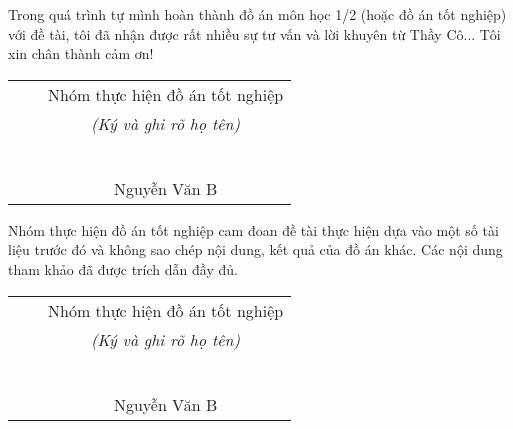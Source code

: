 \documentclass[a4paper, oneside]{book}
\begin{document}
\coverpage
\frontmatter


\begin{acknowledgments}
	Trong quá trình tự mình hoàn thành đồ án môn học 1/2 (hoặc đồ án tốt nghiệp) với đề tài, tôi đã nhận được rất nhiều sự tư vấn và lời khuyên từ Thầy Cô... Tôi xin chân thành cảm ơn!
\begin{table}[!h]
\centering
\begin{tabular}{p{3cm} p{3cm} p{3cm} p{3cm}}
&  & \multicolumn{2}{c}{Nhóm thực hiện đồ án tốt nghiệp} \\
&  & \multicolumn{2}{c}{\textit{(Ký và ghi rõ họ tên)}} \\
&  &             &            \\
&  &             &            \\
&  &             &            \\
&  &             &            \\
&  &             &            \\
&  &             &            \\
&  & \multicolumn{2}{c}{Nguyễn Văn B}     
\end{tabular}
\end{table}
\end{acknowledgments}

\begin{declaration}
	Nhóm thực hiện đồ án tốt nghiệp cam đoan đề tài thực hiện dựa vào một số tài liệu trước đó và không sao chép nội dung, kết quả của đồ án khác. Các nội dung tham khảo đã được trích dẫn đầy đủ.
 \\
\begin{table}[!h]
\centering
\begin{tabular}{p{3cm} p{3cm} p{3cm} p{3cm}}
&  & \multicolumn{2}{c}{Nhóm thực hiện đồ án tốt nghiệp} \\
&  & \multicolumn{2}{c}{\textit{(Ký và ghi rõ họ tên)}} \\
&  &             &            \\
&  &             &            \\
&  &             &            \\
&  &             &            \\
&  &             &            \\
&  &             &            \\
&  & \multicolumn{2}{c}{Nguyễn Văn B}       
\end{tabular}
\end{table}
\end{declaration}
\end{document}
